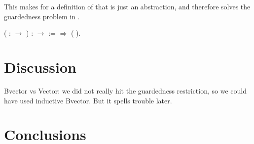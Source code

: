 This makes for a definition of 
that is just an abstraction, and therefore solves the guardedness problem in
.
\begin{singlespace}
\begin{coqdoccode}
\coqdocnoindent
{} 
  ( :
 \ensuremath{\rightarrow} ) 
:  
 \ensuremath{\rightarrow}
 
 :=\coqdoceol
\coqdocindent{1.00em}
   \ensuremath{\Rightarrow}
 ( ).\coqdoceol
\end{coqdoccode}
\end{singlespace}


\section{Discussion}

Bvector vs Vector: we did not really hit the guardedness restriction, so we
could have used inductive Bvector. But it spells trouble later.


\section{Conclusions}
